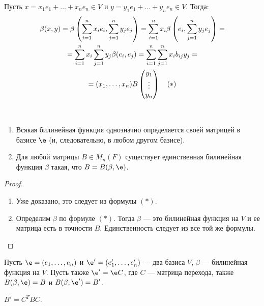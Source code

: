 Пусть $x = x_1e_1 + \ldots + x_ne_n \in V$ и $y = y_1e_1 + \ldots + y_ne_n \in V$. Тогда:
\begin{gather*}
\beta(x, y) = \beta\left(\sum_{i = 1}^{n}x_ie_i, \sum_{j = 1}^{n}y_je_j\right) = \sum_{i = 1}^{n} x_i\beta\left(e_i, \sum_{j = 1}^{n}y_je_j\right) = \\
= \sum_{i = 1}^{n}x_i\sum_{j = 1}^{n}y_j\beta(e_i, e_j) = \sum_{i = 1}^{n}\sum_{j = 1}^{n}x_ib_{ij}y_j = \\
= (x_1, \ldots, x_n)B \begin{pmatrix}{y}_1 \\\vdots\\{y}_n\end{pmatrix} \quad (*)
\end{gather*}

\begin{Suggestion}\
\begin{enumerate}
\item Всякая билинейная функция однозначно определяется своей матрицей в базисе $\e$ (и, следовательно, в любом другом базисе).
\item Для любой матрицы $B \in M_n(F)$ существует единственная билинейная функция $\beta$ такая, что $B = B(\beta, \e)$.
\end{enumerate}
\end{Suggestion}

\begin{proof}\
\begin{enumerate}
\item Уже доказано, это следует из формулы $(*)$.
\item Определим $\beta$ по формуле $(*)$. Тогда $\beta$ --- это билинейная функция на $V$ и ее матрица есть в точности $B$. Единственность следует из все той же формулы.
\end{enumerate}
\end{proof}

Пусть $\e = (e_1, \ldots, e_n)$ и $\e' = (e'_1, \ldots, e'_n)$ --- два базиса $V$, $\beta$ --- билинейная функция на $V$. Пусть также $\e' = \e C$, где $C$ --- матрица перехода, также $B(\beta, \e) = B$ и $B(\beta, \e') = B'$.

\begin{Suggestion}
$B' = C^TBC$.
\end{Suggestion}

